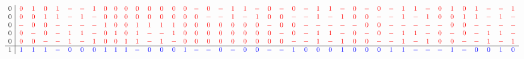 \documentclass{beamer}
\newcommand{\rred}[1]{\textcolor{red}{#1}}
\newcommand{\bblue}[1]{\textcolor{blue}{#1}}
\begin{document}
\begin{frame}
\begin{tiny}
\[\begin{array}{c|cccccccccccccccccccccccccccccccccccccccccc}
          0&\rred{0}&\rred{1}&\rred{0}&\rred{1}&\rred{-}&\rred{-}&\rred{1}&\rred{0}&\rred{0}&\rred{0}&\rred{0}&\rred{0}&\rred{0}&\rred{0}&\rred{0}&\rred{-}&\rred{0}&\rred{-}&\rred{1}&\rred{1}&\rred{-}&\rred{0}&\rred{-}&\rred{0}&\rred{-}&\rred{1}&\rred{1}&\rred{-}&\rred{0}&\rred{-}&\rred{0}&\rred{-}&\rred{1}&\rred{1}&\rred{-}&\rred{0}&\rred{1}&\rred{0}&\rred{1}&\rred{-}&\rred{-}&\rred{1}\\
          0&\rred{0}&\rred{0}&\rred{1}&\rred{1}&\rred{-}&\rred{1}&\rred{-}&\rred{0}&\rred{0}&\rred{0}&\rred{0}&\rred{0}&\rred{0}&\rred{0}&\rred{0}&\rred{0}&\rred{-}&\rred{-}&\rred{1}&\rred{-}&\rred{1}&\rred{0}&\rred{0}&\rred{-}&\rred{-}&\rred{1}&\rred{-}&\rred{1}&\rred{0}&\rred{0}&\rred{-}&\rred{-}&\rred{1}&\rred{-}&\rred{1}&\rred{0}&\rred{0}&\rred{1}&\rred{1}&\rred{-}&\rred{1}&\rred{-}\\
          0&\rred{-}&\rred{0}&\rred{0}&\rred{-}&\rred{-}&\rred{-}&\rred{-}&\rred{1}&\rred{0}&\rred{0}&\rred{1}&\rred{1}&\rred{1}&\rred{1}&\rred{0}&\rred{0}&\rred{0}&\rred{0}&\rred{0}&\rred{0}&\rred{0}&\rred{-}&\rred{0}&\rred{0}&\rred{-}&\rred{-}&\rred{-}&\rred{-}&\rred{-}&\rred{0}&\rred{0}&\rred{-}&\rred{-}&\rred{-}&\rred{-}&\rred{-}&\rred{0}&\rred{0}&\rred{-}&\rred{-}&\rred{-}&\rred{-}\\
          0&\rred{0}&\rred{-}&\rred{0}&\rred{-}&\rred{1}&\rred{1}&\rred{-}&\rred{0}&\rred{1}&\rred{0}&\rred{1}&\rred{-}&\rred{-}&\rred{1}&\rred{0}&\rred{0}&\rred{0}&\rred{0}&\rred{0}&\rred{0}&\rred{0}&\rred{0}&\rred{-}&\rred{0}&\rred{-}&\rred{1}&\rred{1}&\rred{-}&\rred{0}&\rred{-}&\rred{0}&\rred{-}&\rred{1}&\rred{1}&\rred{-}&\rred{0}&\rred{-}&\rred{0}&\rred{-}&\rred{1}&\rred{1}&\rred{-}\\
          0&\rred{0}&\rred{0}&\rred{-}&\rred{-}&\rred{1}&\rred{-}&\rred{1}&\rred{0}&\rred{0}&\rred{1}&\rred{1}&\rred{-}&\rred{1}&\rred{-}&\rred{0}&\rred{0}&\rred{0}&\rred{0}&\rred{0}&\rred{0}&\rred{0}&\rred{0}&\rred{0}&\rred{-}&\rred{-}&\rred{1}&\rred{-}&\rred{1}&\rred{0}&\rred{0}&\rred{-}&\rred{-}&\rred{1}&\rred{-}&\rred{1}&\rred{0}&\rred{0}&\rred{-}&\rred{-}&\rred{1}&\rred{-}&\rred{1}\\ \hline
          1&\bblue{1}&\bblue{1}&\bblue{1}&\bblue{-}&\bblue{0}&\bblue{0}&\bblue{0}&\bblue{1}&\bblue{1}&\bblue{1}&\bblue{-}&\bblue{0}&\bblue{0}&\bblue{0}&\bblue{1}&\bblue{-}&\bblue{-}&\bblue{0}&\bblue{-}&\bblue{0}&\bblue{0}&\bblue{-}&\bblue{-}&\bblue{1}&\bblue{0}&\bblue{0}&\bblue{0}&\bblue{1}&\bblue{0}&\bblue{0}&\bblue{0}&\bblue{1}&\bblue{1}&\bblue{-}&\bblue{-}&\bblue{-}&\bblue{1}&\bblue{-}&\bblue{0}&\bblue{0}&\bblue{1}&\bblue{0}\\

\end{array}\]
\end{tiny}
\end{frame}
\end{document}
